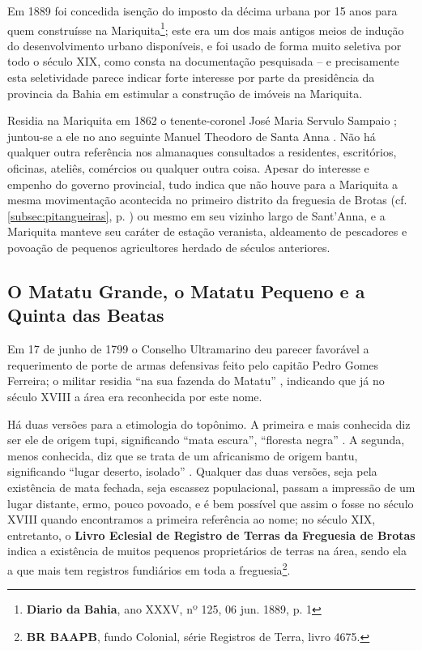 Em 1889 foi concedida isenção do imposto da décima urbana por 15 anos para quem construísse na Mariquita\footnote{\textbf{Diario da Bahia}, ano XXXV, nº 125, 06 jun. 1889, p. 1}; este era um dos mais antigos meios de indução do desenvolvimento urbano disponíveis, e foi usado de forma muito seletiva por todo o século XIX, como consta na documentação pesquisada -- e precisamente esta seletividade parece indicar forte interesse por parte da presidência da provincia da Bahia em estimular a construção de imóveis na Mariquita.

Residia na Mariquita em 1862 o tenente-coronel José Maria Servulo Sampaio \cite[p.~232]{masson_almanak_1862}; juntou-se a ele no ano seguinte Manuel Theodoro de Santa Anna \cite[p.~260]{masson_almanak_1863}. Não há qualquer outra referência nos almanaques consultados a residentes, escritórios, oficinas, ateliês, comércios ou qualquer outra coisa. Apesar do interesse e empenho do governo provincial, tudo indica que não houve para a Mariquita a mesma movimentação acontecida no primeiro distrito da freguesia de Brotas (cf. \autoref{subsec:pitangueiras}, p. \pageref{subsec:pitangueiras}) ou mesmo em seu vizinho largo de Sant'Anna, e a Mariquita manteve seu caráter de estação veranista, aldeamento de pescadores e povoação de pequenos agricultores herdado de séculos anteriores.

\subsection{O Matatu Grande, o Matatu Pequeno e a Quinta das Beatas}\label{subsec:matatubeatas}

Em 17 de junho de 1799 o Conselho Ultramarino deu parecer favorável a requerimento de porte de armas defensivas feito pelo capitão Pedro Gomes Ferreira; o militar residia ``na sua fazenda do Matatu'' \cite[p.~228]{castralmeida_ultramar_1914}, indicando que já no século XVIII a área era reconhecida por este nome. 

Há duas versões para a etimologia do topônimo. A primeira e mais conhecida diz ser ele de origem tupi, significando ``mata escura'', ``floresta negra'' \cite[p.~281]{sampaio_tupi_1987}. A segunda, menos conhecida, diz que se trata de um africanismo de origem bantu, significando ``lugar deserto, isolado'' \cite[p. 46]{dorea_ruas_2006}. Qualquer das duas versões, seja pela existência de mata fechada, seja escassez populacional, passam a impressão de um lugar distante, ermo, pouco povoado, e é bem possível que assim o fosse no século XVIII quando encontramos a primeira referência ao nome; no século XIX, entretanto, o \textbf{Livro Eclesial de Registro de Terras da Freguesia de Brotas} indica a existência de muitos pequenos proprietários de terras na área, sendo ela a que mais tem registros fundiários em toda a freguesia\footnote{\textbf{BR BAAPB}, fundo Colonial, série Registros de Terra, livro 4675.}.

